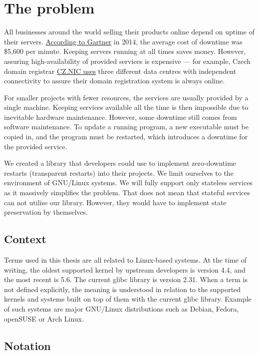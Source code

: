\chapter{The problem}

All businesses around the world selling their products online depend on uptime of their servers. \href{https://blogs.gartner.com/andrew-lerner/2014/07/16/the-cost-of-downtime/}{According to Gartner} in 2014, the average cost of downtime was \$5,600 per minute. Keeping servers running at all times saves money. However, assuring high-availability of provided services is expensive — for example, Czech domain registrar \href{https://www.nic.cz/page/350/registry-system/}{CZ.NIC uses} three different data centres with independent connectivity to assure their domain registration system is always online.

For smaller projects with fewer resources, the services are usually provided by a single machine. Keeping services available all the time is then impossible due to inevitable hardware maintenance. However, some downtime still comes from software maintenance. To update a running program, a new executable must be copied in, and the program must be restarted, which introduces a downtime for the provided service.

We created a library that developers could use to implement zero-downtime restarts (transparent restarts) into their projects. We limit ourselves to the environment of GNU/Linux systems. We will fully support only stateless services as it massively simplifies the problem. That does not mean that stateful services can not utilise our library. However, they would have to implement state preservation by themselves.

\section{Context}

Terms used in this thesis are all related to Linux-based systems. At the time of writing, the oldest supported kernel by upstream developers is version 4.4, and the most recent is 5.6. The current glibc library is version 2.31. When a term is not defined explicitly, the meaning is understood in relation to the supported kernels and systems built on top of them with the current glibc library. Example of such systems are major GNU/Linux distributions such as Debian, Fedora, openSUSE or Arch Linux.

\section{Notation}

